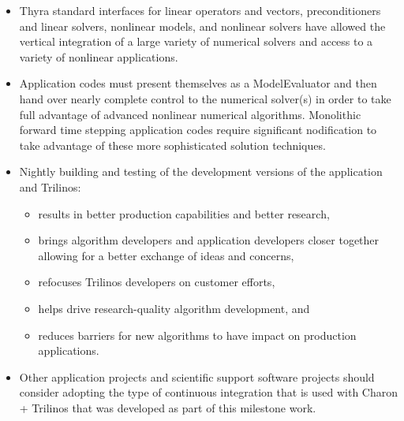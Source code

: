\documentclass[pdf,ps2pdf,11pt]{SANDreport}
\begin{document}
{\begin{itemize}
{}\item Thyra standard interfaces for linear operators and vectors,
preconditioners and linear solvers, nonlinear models, and nonlinear solvers
have allowed the vertical integration of a large variety of numerical solvers
and access to a variety of nonlinear applications.

{}\item Application codes must present themselves as a ModelEvaluator and then
hand over nearly complete control to the numerical solver(s) in order to take
full advantage of advanced nonlinear numerical algorithms.  Monolithic forward
time stepping application codes require significant nodification to take advantage of these more
sophisticated solution techniques.

{}\item Nightly building and testing of the development versions of the
application and Trilinos:

  \begin{itemize}

  {}\item results in better production capabilities and better research,

  {}\item brings algorithm developers and application developers closer
  together allowing for a better exchange of ideas and concerns,

  {}\item refocuses Trilinos developers on customer efforts,

  {}\item helps drive research-quality algorithm development, and
        
  {}\item reduces barriers for new algorithms to have impact on production
  applications.

  \end{itemize}

{}\item Other application projects and scientific support software projects
should consider adopting the type of continuous integration that is used with
Charon + Trilinos that was developed as part of this milestone work.

\end{itemize}


%

\clearpage
\providecommand*{\phantomsection}{}
\phantomsection
{}



}
\end{document}
